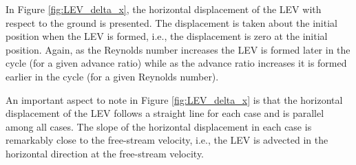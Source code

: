 In Figure \ref{fig:LEV_delta_x}, the horizontal displacement of the LEV with respect to the ground is presented.
The displacement is taken about the initial position when the LEV is formed, i.e., the displacement is zero at the initial position.
Again, as the Reynolds number increases the LEV is formed later in the cycle (for a given advance ratio) while as the advance ratio increases it is formed earlier in the cycle (for a given Reynolds number).

An important aspect to note in Figure \ref{fig:LEV_delta_x} is that the horizontal displacement of the LEV follows a straight line for each case and is parallel among all cases.
The slope of the horizontal displacement in each case is remarkably close to the free-stream velocity, i.e., the LEV is advected in the horizontal direction at the free-stream velocity.

